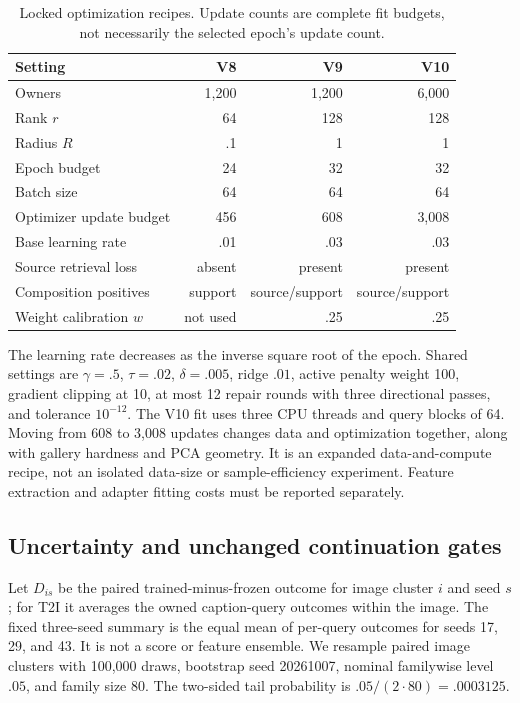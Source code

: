 \documentclass[11pt]{article}
\begin{document}
\begin{table}[t]
\centering\small
\caption{Locked optimization recipes. Update counts are complete fit
budgets, not necessarily the selected epoch's update count.}\label{tab:recipe}
\begin{tabular}{lrrr}
\toprule
Setting & V8 & V9 & V10\\
\midrule
Owners & 1,200 & 1,200 & 6,000\\
Rank $r$ & 64 & 128 & 128\\
Radius $R$ & .1 & 1 & 1\\
Epoch budget & 24 & 32 & 32\\
Batch size & 64 & 64 & 64\\
Optimizer update budget & 456 & 608 & 3,008\\
Base learning rate & .01 & .03 & .03\\
Source retrieval loss & absent & present & present\\
Composition positives & support & source/support & source/support\\
Weight calibration $w$ & not used & .25 & .25\\
\bottomrule
\end{tabular}
\end{table}
The learning rate decreases as the inverse square root of the epoch.
Shared settings are $\gamma=.5$, $\tau=.02$, $\delta=.005$, ridge $.01$,
active penalty weight 100, gradient clipping at 10, at most 12 repair
rounds with three directional passes, and tolerance $10^{-12}$.
The V10 fit uses three CPU threads and query blocks of 64.
Moving from 608 to 3,008 updates changes data and optimization together,
along with gallery hardness and PCA geometry. It is an expanded
data-and-compute recipe, not an isolated data-size or sample-efficiency
experiment. Feature extraction and adapter fitting costs must be reported
separately.

\subsection{Uncertainty and unchanged continuation gates}
Let $D_{is}$ be the paired trained-minus-frozen outcome for image cluster
$i$ and seed $s$; for T2I it averages the owned caption-query outcomes within
the image. The fixed three-seed summary is the equal mean of per-query
outcomes for seeds 17, 29, and 43. It is not a score or feature ensemble.
We resample paired image clusters with 100,000 draws, bootstrap seed
20261007, nominal familywise level $.05$, and family size 80. The two-sided
tail probability is $.05/(2\cdot80)=.0003125$.
\end{document}
